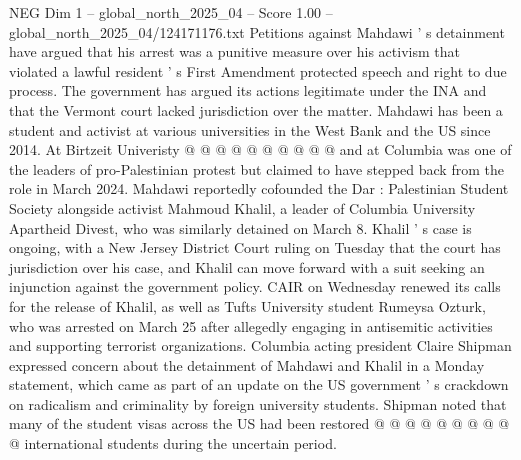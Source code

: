 \begin{textsample}{NEG Dim 1 – global\_north\_2025\_04 – Score 1.00 – global\_north\_2025\_04/124171176.txt}
Petitions against Mahdawi ' s detainment have argued that his arrest was a punitive measure over his activism that violated a lawful resident ' s First Amendment protected speech and right to due process.
The government has argued its actions legitimate under the INA and that the Vermont court lacked jurisdiction over the matter.
Mahdawi has been a student and activist at various universities in the West Bank and the US since 2014.
At Birtzeit Univeristy @ @ @ @ @ @ @ @ @ @ and at Columbia was one of the leaders of pro-Palestinian protest but claimed to have stepped back from the role in March 2024.
Mahdawi reportedly cofounded the Dar : Palestinian Student Society alongside activist Mahmoud Khalil, a leader of Columbia University Apartheid Divest, who was similarly detained on March 8.
Khalil ' s case is ongoing, with a New Jersey District Court ruling on Tuesday that the court has jurisdiction over his case, and Khalil can move forward with a suit seeking an injunction against the government policy.
CAIR on Wednesday renewed its calls for the release of Khalil, as well as Tufts University student Rumeysa Ozturk, who was arrested on March 25 after allegedly engaging in antisemitic activities and supporting terrorist organizations.
Columbia acting president Claire Shipman expressed concern about the detainment of Mahdawi and Khalil in a Monday statement, which came as part of an update on the US government ' s crackdown on radicalism and criminality by foreign university students.
Shipman noted that many of the student visas across the US had been restored @ @ @ @ @ @ @ @ @ @ international students during the uncertain period.

\end{textsample}
